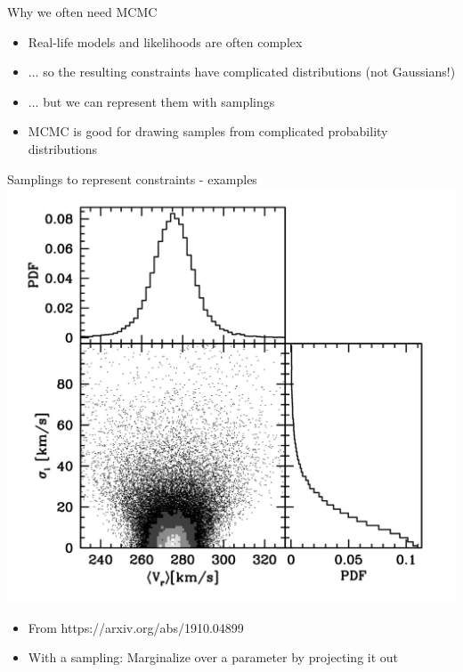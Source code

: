 \documentclass{beamer}
\begin{document}
\begin{frame}{Why we often need MCMC}
  \begin{itemize}
  \item Real-life models and likelihoods are often complex
  \item $\ldots$ so the resulting \alert{constraints} have complicated distributions (not Gaussians!)
  \item $\ldots$ but we can represent them with \alert{samplings}
  \item MCMC is good for drawing samples from complicated probability distributions
  \end{itemize}
\end{frame}

\begin{frame}{Samplings to represent constraints - examples}
  \includegraphics[height=0.5\textwidth]{corner}
  \begin{itemize}
  \item From https://arxiv.org/abs/1910.04899
  \item With a sampling: \alert{Marginalize} over a parameter by projecting it out
  \end{itemize}
\end{frame}
\end{document}
